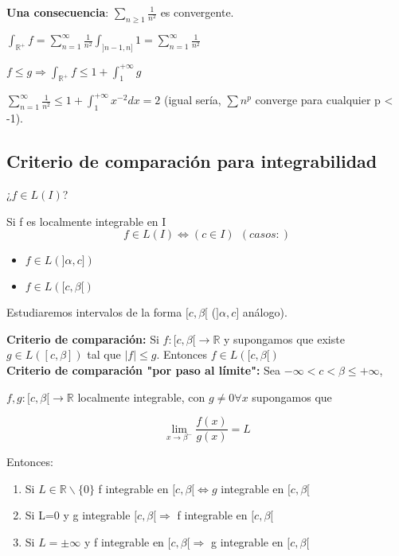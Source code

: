 \documentclass{article}
\begin{document}
\textbf{Una consecuencia}: $\sum_{n \geq 1} \frac{1}{n^2}$ es convergente.

$\int_{\mathbb{R}^+} f = \sum_{n=1}^\infty \frac{1}{n^2} \int_{]n-1,n]} 1 = \sum_{n=1}^\infty \frac{1}{n^2}$

$f \leq g \Rightarrow \int_{\mathbb{R}^+} f \leq 1 + \int_1^{+\infty} g$

$\sum_{n=1}^\infty \frac{1}{n^2} \leq 1 + \int_1^{+\infty} x^{-2} dx = 2$ (igual sería, $\sum n^p$ converge para cualquier p < -1).

\subsection{Criterio de comparación para integrabilidad}
¿$f \in L(I)$?

Si f es localmente integrable en I
\begin{equation*}
f \in L(I) \Leftrightarrow (c \in I) \>\>(casos:)
\end{equation*}
\begin{itemize}
\item $f \in L(]\alpha,c])$
\item $f \in L([c,\beta[)$
\end{itemize}

Estudiaremos intervalos de la forma $[c,\beta[$ ($]\alpha,c]$ análogo).

\textbf{Criterio de comparación:} Si $f:[c,\beta[ \rightarrow \mathbb{R}$ y supongamos que existe $g \in L([c,\beta])$ tal que $|f| \leq g$. Entonces $f \in L([c,\beta[)$  \\

\textbf{Criterio de comparación "por paso al límite":} Sea $-\infty < c < \beta \leq +\infty$, 

$f,g:[c,\beta[ \rightarrow \mathbb{R}$ localmente integrable, con $g \neq 0 \forall x$ supongamos que

\begin{equation*}
\lim_{x \to \beta^-} \frac{f(x)}{g(x)}=L
\end{equation*}

Entonces:
\begin{enumerate}[label=(\roman*)]
\item Si $L \in \mathbb{R}\backslash\{0\}$ f integrable en $[c,\beta[ \Leftrightarrow g$ integrable en $[c,\beta[$
\item Si L=0 y g integrable $[c,\beta[ \Rightarrow$ f integrable en $[c,\beta[$
\item Si $L=\pm \infty$ y f integrable en $[c,\beta[ \Rightarrow$ g integrable en $[c,\beta[$
\end{enumerate}
\end{document}
